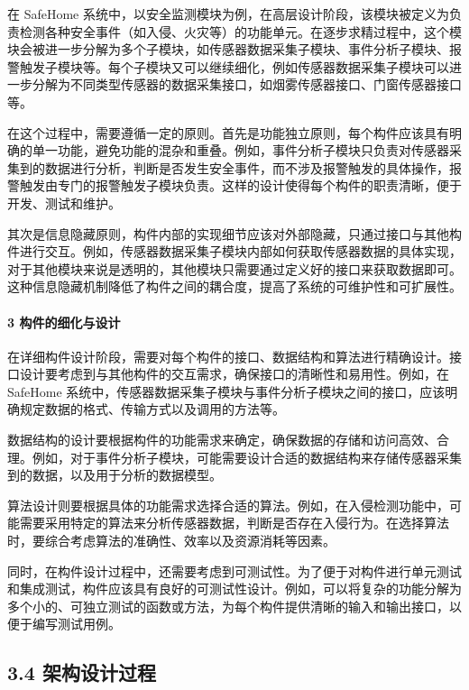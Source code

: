 在 SafeHome 系统中，以安全监测模块为例，在高层设计阶段，该模块被定义为负责检测各种安全事件（如入侵、火灾等）的功能单元。在逐步求精过程中，这个模块会被进一步分解为多个子模块，如传感器数据采集子模块、事件分析子模块、报警触发子模块等。每个子模块又可以继续细化，例如传感器数据采集子模块可以进一步分解为不同类型传感器的数据采集接口，如烟雾传感器接口、门窗传感器接口等。

在这个过程中，需要遵循一定的原则。首先是功能独立原则，每个构件应该具有明确的单一功能，避免功能的混杂和重叠。例如，事件分析子模块只负责对传感器采集到的数据进行分析，判断是否发生安全事件，而不涉及报警触发的具体操作，报警触发由专门的报警触发子模块负责。这样的设计使得每个构件的职责清晰，便于开发、测试和维护。

其次是信息隐藏原则，构件内部的实现细节应该对外部隐藏，只通过接口与其他构件进行交互。例如，传感器数据采集子模块内部如何获取传感器数据的具体实现，对于其他模块来说是透明的，其他模块只需要通过定义好的接口来获取数据即可。这种信息隐藏机制降低了构件之间的耦合度，提高了系统的可维护性和可扩展性。

\paragraph{3 构件的细化与设计}\label{ux6784ux4ef6ux7684ux7ec6ux5316ux4e0eux8bbeux8ba1}

在详细构件设计阶段，需要对每个构件的接口、数据结构和算法进行精确设计。接口设计要考虑到与其他构件的交互需求，确保接口的清晰性和易用性。例如，在 SafeHome 系统中，传感器数据采集子模块与事件分析子模块之间的接口，应该明确规定数据的格式、传输方式以及调用的方法等。

数据结构的设计要根据构件的功能需求来确定，确保数据的存储和访问高效、合理。例如，对于事件分析子模块，可能需要设计合适的数据结构来存储传感器采集到的数据，以及用于分析的数据模型。

算法设计则要根据具体的功能需求选择合适的算法。例如，在入侵检测功能中，可能需要采用特定的算法来分析传感器数据，判断是否存在入侵行为。在选择算法时，要综合考虑算法的准确性、效率以及资源消耗等因素。

同时，在构件设计过程中，还需要考虑到可测试性。为了便于对构件进行单元测试和集成测试，构件应该具有良好的可测试性设计。例如，可以将复杂的功能分解为多个小的、可独立测试的函数或方法，为每个构件提供清晰的输入和输出接口，以便于编写测试用例。

\subsection{3.4 架构设计过程}\label{ux67b6ux6784ux8bbeux8ba1ux8fc7ux7a0b}

